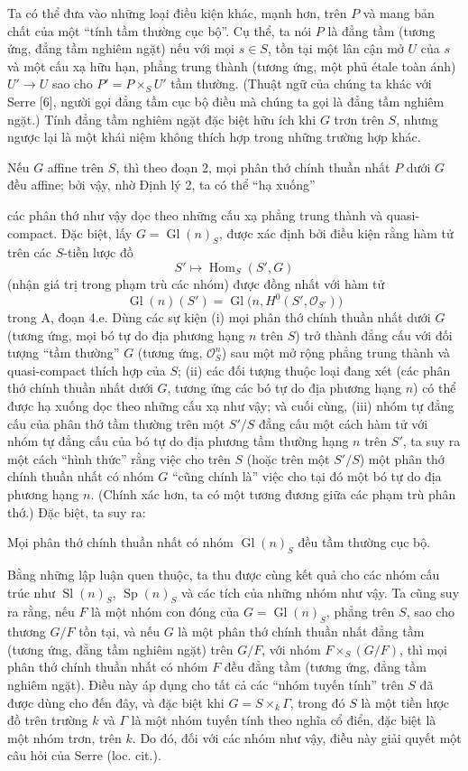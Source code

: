 Ta có thể đưa vào những loại điều kiện khác, mạnh hơn, trên $P$ và mang bản chất
của một ``tính tầm thường cục bộ''. Cụ thể, ta nói $P$ là đẳng tầm
(tương ứng, đẳng tầm nghiêm ngặt) nếu với mọi $s\in S$, tồn tại một lân
cận mở $U$ của $s$ và một cấu xạ hữu hạn, phẳng trung thành (tương ứng, một phủ
étale toàn ánh) $U'\longrightarrow U$ sao cho $P'=P\times_SU'$ tầm thường.
(Thuật ngữ của chúng ta khác với Serre [6], người gọi đẳng tầm cục bộ
điều mà chúng ta gọi là đẳng tầm nghiêm ngặt.) Tính đẳng tầm nghiêm ngặt
đặc biệt hữu ích khi $G$ trơn trên $S$, nhưng ngược lại là một khái niệm không
thích hợp trong những trường hợp khác.

Nếu $G$ affine trên $S$, thì theo đoạn 2, mọi phân thớ chính thuần nhất $P$ dưới
$G$ đều affine; bởi vậy, nhờ Định lý 2, ta có thể ``hạ xuống''

các phân thớ như vậy dọc theo những cấu xạ phẳng trung thành và quasi-compact.
Đặc biệt, lấy $G=\operatorname{Gl}(n)_S$, được xác định bởi điều kiện rằng hàm
tử trên các $S$-tiền lược đồ
\[
  S'\longmapsto\operatorname{Hom}_S(S',G)
\]
(nhận giá trị trong phạm trù các nhóm) được đồng nhất với hàm tử
\[
  \operatorname{Gl}(n)(S')
  =\operatorname{Gl}\bigl(n,H^0(S',\mathcal O_{S'})\bigr)
\]
trong A, đoạn 4.e. Dùng các sự kiện (i) mọi phân thớ chính thuần nhất dưới $G$
(tương ứng, mọi bó tự do địa phương hạng $n$ trên $S$) trở thành đẳng cấu với
đối tượng ``tầm thường'' $G$ (tương ứng, $\mathcal O_S^n$) sau một mở rộng
phẳng trung thành và quasi-compact thích hợp của $S$; (ii) các đối tượng thuộc
loại đang xét (các phân thớ chính thuần nhất dưới $G$, tương ứng các bó tự do
địa phương hạng $n$) có thể được hạ xuống dọc theo những cấu xạ như vậy; và
cuối cùng, (iii) nhóm tự đẳng cấu của phân thớ tầm thường trên một $S'/S$ đẳng
cấu một cách hàm tử với nhóm tự đẳng cấu của bó tự do địa phương tầm thường
hạng $n$ trên $S'$, ta suy ra một cách ``hình thức'' rằng việc cho trên $S$
(hoặc trên một $S'/S$) một phân thớ chính thuần nhất có nhóm $G$ ``cũng chính
là'' việc cho tại đó một bó tự do địa phương hạng $n$. (Chính xác hơn, ta có
một tương đương giữa các phạm trù phân thớ.) Đặc biệt, ta suy ra:

 Mọi phân thớ chính thuần nhất có nhóm
$\operatorname{Gl}(n)_S$ đều tầm thường cục bộ.

Bằng những lập luận quen thuộc, ta thu được cùng kết quả cho các nhóm cấu trúc
như $\operatorname{Sl}(n)_S$, $\operatorname{Sp}(n)_S$ và các tích của những
nhóm như vậy. Ta cũng suy ra rằng, nếu $F$ là một nhóm con đóng của
$G=\operatorname{Gl}(n)_S$, phẳng trên $S$, sao cho thương $G/F$ tồn tại, và
nếu $G$ là một phân thớ chính thuần nhất đẳng tầm (tương ứng, đẳng tầm nghiêm
ngặt) trên $G/F$, với nhóm $F\times_S(G/F)$, thì mọi phân thớ chính thuần nhất
có nhóm $F$ đều đẳng tầm (tương ứng, đẳng tầm nghiêm ngặt). Điều này áp dụng
cho tất cả các ``nhóm tuyến tính'' trên $S$ đã được dùng cho đến đây, và đặc
biệt khi $G=S\times_k\Gamma$, trong đó $S$ là một tiền lược đồ trên trường $k$
và $\Gamma$ là một nhóm tuyến tính theo nghĩa cổ điển, đặc biệt là một nhóm
trơn, trên $k$. Do đó, đối với các nhóm như vậy, điều này giải quyết một câu hỏi
của Serre (loc. cit.).

